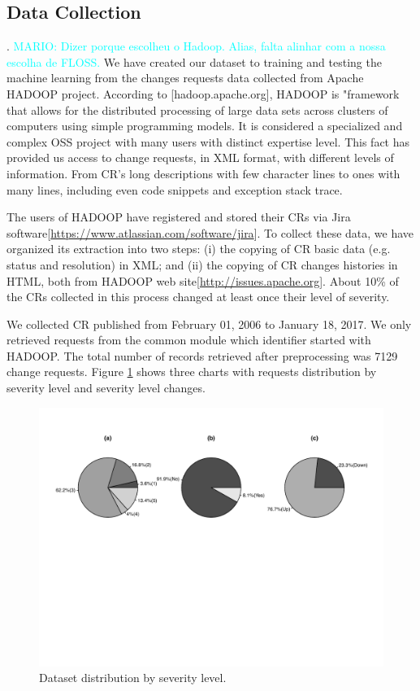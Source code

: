 \documentclass[10pt, conference]{IEEEtran}
\newcommand{\mario}[1]{\noindent\textcolor{cyan}{MARIO: {#1}}}
\newcommand{\mario}[1]{}
\begin{document}
\subsection{Data Collection}. 
\mario{Dizer porque escolheu o Hadoop. Alias, falta alinhar com a nossa escolha de FLOSS.} We have created our dataset to training and testing the machine learning from the changes requests data collected from Apache HADOOP project. According to [hadoop.apache.org], HADOOP is "framework that allows for the distributed processing of large data sets across clusters of computers using simple programming models. It is considered a specialized and complex OSS project with many users with distinct expertise level. This fact has provided us access to change requests, in XML format, with different levels of information. From CR's long descriptions with few character lines to ones with many lines, including even code snippets and exception stack trace.

The users of HADOOP have registered and stored their CRs via Jira
software[\url{https://www.atlassian.com/software/jira}]. To collect these data, we have organized its extraction into two steps: (i) the copying of CR basic data (e.g. status and resolution) in XML; and (ii) the copying of CR changes histories in HTML, both from HADOOP web site[\url{http://issues.apache.org}]. About 10\% of the CRs collected in this process changed at least once their level of severity.

We collected CR published from February 01, 2006 to January 18, 2017.  We only retrieved requests from the common module which identifier started with HADOOP. The total number of records retrieved after preprocessing was 7129 change requests. Figure \ref{fig:ds_distribution} shows three charts with requests distribution by severity level and severity level changes.

\begin{figure}[!hbt]
  \label{fig:ds_distribution}
  \includegraphics{figures/ds_distribution.pdf}
  \caption{Dataset distribution by severity level.}
\end{figure}
\end{document}
